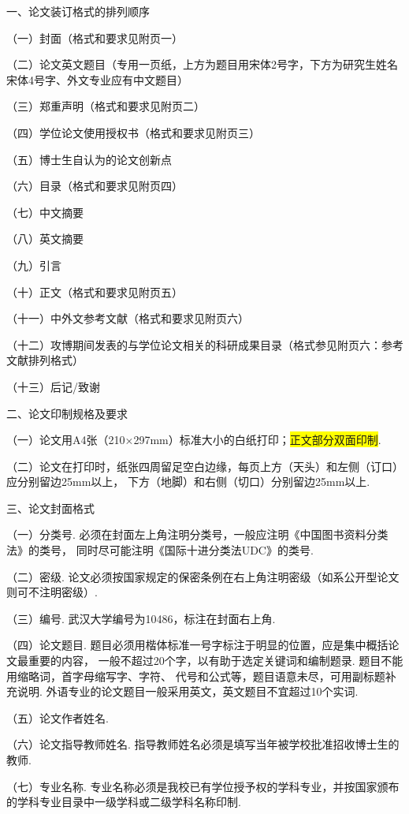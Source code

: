 \documentclass{WHUPhd}  %
\begin{document}
{\heiti 一、论文装订格式的排列顺序}

（一）封面（格式和要求见附页一）

（二）论文英文题目（专用一页纸，上方为题目用宋体2号字，下方为研究生姓名宋体4号字、外文专业应有中文题目）

（三）郑重声明（格式和要求见附页二）

（四）学位论文使用授权书（格式和要求见附页三）

（五）博士生自认为的论文创新点

（六）目录（格式和要求见附页四）

（七）中文摘要

（八）英文摘要

（九）引言

（十）正文（格式和要求见附页五）

（十一）中外文参考文献（格式和要求见附页六）

（十二）攻博期间发表的与学位论文相关的科研成果目录（格式参见附页六：参考文献排列格式）

（十三）后记/致谢

{\heiti 二、论文印制规格及要求}

（一）论文用A4张（210×297mm）标准大小的白纸打印；\colorbox{yellow}{正文部分双面印制}.

（二）论文在打印时，纸张四周留足空白边缘，每页上方（天头）和左侧（订口）应分别留边25mm以上，
下方（地脚）和右侧（切口）分别留边25mm以上.

{\heiti 三、论文封面格式}

（一）分类号. 必须在封面左上角注明分类号，一般应注明《中国图书资料分类法》的类号，
同时尽可能注明《国际十进分类法UDC》的类号.

（二）密级. 论文必须按国家规定的保密条例在右上角注明密级（如系公开型论文则可不注明密级）.

（三）编号. 武汉大学编号为10486，标注在封面右上角.

（四）论文题目. 题目必须用楷体标准一号字标注于明显的位置，应是集中概括论文最重要的内容，
一般不超过20个字，以有助于选定关键词和编制题录. 题目不能用缩略词，首字母缩写字、字符、
代号和公式等，题目语意未尽，可用副标题补充说明. 外语专业的论文题目一般采用英文，英文题目不宜超过10个实词.

（五）论文作者姓名.

（六）论文指导教师姓名. 指导教师姓名必须是填写当年被学校批准招收博士生的教师.

（七）专业名称. 专业名称必须是我校已有学位授予权的学科专业，并按国家颁布的学科专业目录中一级学科或二级学科名称印制.
\end{document}
